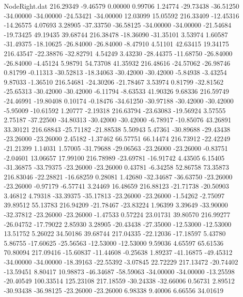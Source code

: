 \begin{filecontents}{NodeRight.dat}
 216.29349   -9.46579    0.00000     0.99706    1.24774  -29.73438  -36.51250  -34.00000  -34.00000  -24.53421  -34.00000   12.03099   15.05592
 216.33409  -12.45316  -14.26575     4.07693    3.28905  -37.33750  -36.58125  -34.00000  -34.00000  -21.54684  -19.73425   49.19435   39.68744
 216.38478  -18.36090  -31.35101     3.53974    1.60587  -31.49375  -18.10625  -26.84000  -26.84000   -8.47910    4.51101   42.63415   19.34175
 216.43547  -22.38876  -32.82791     4.54249    3.43230  -28.44375  -11.68750  -26.84000  -26.84000   -4.45124    5.98791   54.73708   41.35932
 216.48616  -24.57062  -26.98746     0.81799   -0.11313  -30.52813  -18.34063  -30.42000  -30.42000   -5.84938   -3.43254    9.87033   -1.36510
 216.54681  -24.30206  -21.78467     3.53974    0.81799  -32.81562  -25.65313  -30.42000  -30.42000   -6.11794   -8.63533   41.90326    9.68336
 216.59749  -24.46991  -19.80408     0.10174   -0.18476  -34.61250  -30.97188  -30.42000  -30.42000   -5.95009  -10.61592    1.20777   -2.19318
 216.63794  -23.63083  -19.56924     3.57555    2.75187  -37.22500  -34.80313  -30.42000  -30.42000   -6.78917  -10.85076   43.26891   33.30121
 216.68843  -25.71182  -21.88538     5.50943    5.47361  -30.89688  -29.43438  -23.26000  -23.26000    2.45182   -1.37462   66.57751   66.14474
 216.73912  -22.42249  -21.21399     1.14031    1.57005  -31.79688  -29.06563  -23.26000  -23.26000   -0.83751   -2.04601   13.06657   17.99100
 216.78989  -23.69781  -16.91742     4.43505    6.15405  -31.36875  -33.79375  -23.26000  -23.26000    0.43781   -6.34258   52.86758   73.35873
 216.83046  -22.28821  -16.68259     0.28081    1.42680  -32.34687  -36.63750  -23.26000  -23.26000   -0.97179   -6.57741    3.24469   16.48659
 216.88123  -21.71738  -20.50903     3.46812    4.79318  -33.39375  -35.17813  -23.26000  -23.26000   -1.54262   -2.75097   39.89512   55.13783
 216.94209  -21.78467  -23.83224     1.96399    3.39649  -33.90000  -32.37812  -23.26000  -23.26000   -1.47533    0.57224   23.01731   39.80570
 216.99277  -26.04752  -17.79022     2.85930    3.28905  -20.43438  -27.35000  -12.53000  -12.53000   13.51752    5.26022   34.50186   39.68744
 217.04335  -22.12036  -17.18597     5.43780    5.86755  -17.60625  -25.56563  -12.53000  -12.53000    9.59036    4.65597   65.61536   70.80094
 217.09416  -15.60837  -11.44608    -0.25638    1.89237  -41.16875  -49.45312  -34.00000  -34.00000  -18.39163  -22.55392   -3.07845   22.72229
 217.13472  -20.74402  -13.59451     8.80417   10.98873  -46.34687  -58.59063  -34.00000  -34.00000  -13.25598  -20.40549  100.33514  125.23108
 217.18559  -30.24338  -32.66006     0.56731    2.89512  -30.93438  -36.98125  -23.26000  -23.26000    6.98338    9.40006    6.66556   34.01619

\end{filecontents}
